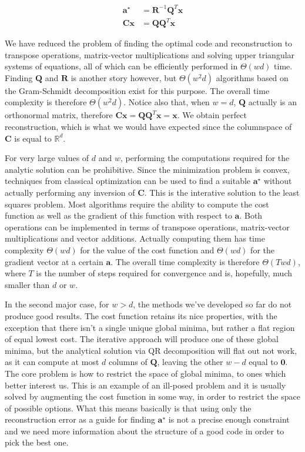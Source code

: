 \documentclass[12pt,a4paper,oneside,english]{UPBThesis}
\newcommand{\hcsignalspace}{\mathbb{R}^d}
\begin{document}
\begin{align*}
\textbf{a}^\star & = \textbf{R}^{-1}\textbf{Q}^T\textbf{x} \\
\textbf{C}\textbf{x} & = \textbf{Q}\textbf{Q}^T\textbf{x}
\end{align*}

We have reduced the problem of finding the optimal code and reconstruction to transpose operations, matrix-vector multiplications and solving upper triangular systems of equations, all of which can be efficiently performed in $\Theta(wd)$ time. Finding $\textbf{Q}$ and $\textbf{R}$ is another story however, but $\Theta(w^2d)$ algorithms based on the Gram-Schmidt decomposition exist for this purpose. The overall time complexity is therefore $\Theta(w^2d)$. Notice also that, when $w = d$, $\textbf{Q}$ actually is an orthonormal matrix, therefore $\textbf{C}\textbf{x} = \textbf{Q}\textbf{Q}^T\textbf{x} = \textbf{x}$. We obtain perfect reconstruction, which is what we would have expected since the columnspace of $\textbf{C}$ is equal to $\hcsignalspace$.

For very large values of $d$ and $w$, performing the computations required for the analytic solution can be prohibitive. Since the minimization problem is convex, techniques from classical optimization can be used to find a suitable $\textbf{a}^\star$ without actually performing any inversion of $\textbf{C}$. This is the interative solution to the least squares problem. Most algorithms require the ability to compute the cost function as well as the gradient of this function with respect to $\textbf{a}$. Both operations can be implemented in terms of transpose operations, matrix-vector multiplications and vector additions. Actually computing them has time complexity $\Theta(wd)$ for the value of the cost function and $\Theta(wd)$ for the gradient vector at a certain $\textbf{a}$. The overall time complexity is therefore $\Theta(Twd)$, where $T$ is the number of steps required for convergence and is, hopefully, much smaller than $d$ or $w$.

In the second major case, for $w > d$, the methods we've developed so far do not produce good results. The cost function retains its nice properties, with the exception that there isn't a single unique global minima, but rather a flat region of equal lowest cost. The iterative approach will produce one of these global minima, but the analytical solution via QR decomposition will flat out not work, as it can compute at most $d$ columns of $\textbf{Q}$, leaving the other $w - d$ equal to $\textbf{0}$. The core problem is how to restrict the space of global minima, to ones which better interest us. This is an example of an ill-posed problem and it is usually solved by augmenting the cost function in some way, in order to restrict the space of possible options. What this means basically is that using only the reconstruction error as a guide for finding $\textbf{a}^\star$ is not a precise enough constraint and we need more information about the structure of a good code in order to pick the best one.
\end{document}
